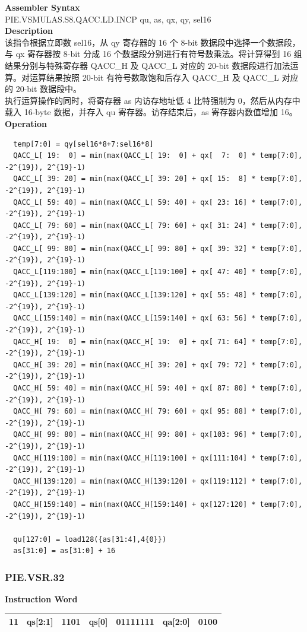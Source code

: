 \textbf{Assembler Syntax} \\
PIE.VSMULAS.S8.QACC.LD.INCP qu, as, qx, qy, sel16 \\
\textbf{Description} \\
该指令根据立即数 sel16，从 qy 寄存器的 16 个 8-bit 数据段中选择一个数据段，与 qx 寄存器按 8-bit 分成 16 个数据段分别进行有符号数乘法。将计算得到 16 组结果分别与特殊寄存器 QACC\_H 及 QACC\_L 对应的 20-bit 数据段进行加法运算。对运算结果按照 20-bit 有符号数取饱和后存入 QACC\_H 及 QACC\_L 对应的 20-bit 数据段中。\\
执行运算操作的同时，将寄存器 as 内访存地址低 4 比特强制为 0，然后从内存中载入 16-byte 数据，并存入 qu 寄存器。访存结束后，as 寄存器内数值增加 16。\\
\textbf{Operation}
\begin{lstlisting}
  temp[7:0] = qy[sel16*8+7:sel16*8]
  QACC_L[ 19:  0] = min(max(QACC_L[ 19:  0] + qx[  7:  0] * temp[7:0], -2^{19}), 2^{19}-1)
  QACC_L[ 39: 20] = min(max(QACC_L[ 39: 20] + qx[ 15:  8] * temp[7:0], -2^{19}), 2^{19}-1)
  QACC_L[ 59: 40] = min(max(QACC_L[ 59: 40] + qx[ 23: 16] * temp[7:0], -2^{19}), 2^{19}-1)
  QACC_L[ 79: 60] = min(max(QACC_L[ 79: 60] + qx[ 31: 24] * temp[7:0], -2^{19}), 2^{19}-1)
  QACC_L[ 99: 80] = min(max(QACC_L[ 99: 80] + qx[ 39: 32] * temp[7:0], -2^{19}), 2^{19}-1)
  QACC_L[119:100] = min(max(QACC_L[119:100] + qx[ 47: 40] * temp[7:0], -2^{19}), 2^{19}-1)
  QACC_L[139:120] = min(max(QACC_L[139:120] + qx[ 55: 48] * temp[7:0], -2^{19}), 2^{19}-1)
  QACC_L[159:140] = min(max(QACC_L[159:140] + qx[ 63: 56] * temp[7:0], -2^{19}), 2^{19}-1)
  QACC_H[ 19:  0] = min(max(QACC_H[ 19:  0] + qx[ 71: 64] * temp[7:0], -2^{19}), 2^{19}-1)
  QACC_H[ 39: 20] = min(max(QACC_H[ 39: 20] + qx[ 79: 72] * temp[7:0], -2^{19}), 2^{19}-1)
  QACC_H[ 59: 40] = min(max(QACC_H[ 59: 40] + qx[ 87: 80] * temp[7:0], -2^{19}), 2^{19}-1)
  QACC_H[ 79: 60] = min(max(QACC_H[ 79: 60] + qx[ 95: 88] * temp[7:0], -2^{19}), 2^{19}-1)
  QACC_H[ 99: 80] = min(max(QACC_H[ 99: 80] + qx[103: 96] * temp[7:0], -2^{19}), 2^{19}-1)
  QACC_H[119:100] = min(max(QACC_H[119:100] + qx[111:104] * temp[7:0], -2^{19}), 2^{19}-1)
  QACC_H[139:120] = min(max(QACC_H[139:120] + qx[119:112] * temp[7:0], -2^{19}), 2^{19}-1)
  QACC_H[159:140] = min(max(QACC_H[159:140] + qx[127:120] * temp[7:0], -2^{19}), 2^{19}-1)

  qu[127:0] = load128({as[31:4],4{0}})
  as[31:0] = as[31:0] + 16
\end{lstlisting}

\newpage
\subsubsection{PIE.VSR.32}\label{instruction:PIEVSR32}
\setlength\tabcolsep{6pt}
\textbf{Instruction Word} \\
\begin{tabular}{|c|c|c|c|c|c|c|}
	\hline
	11 & qs[2:1] & 1101 & qs[0] & 01111111 & qa[2:0] & 0100 \\
	\hline
\end{tabular}

